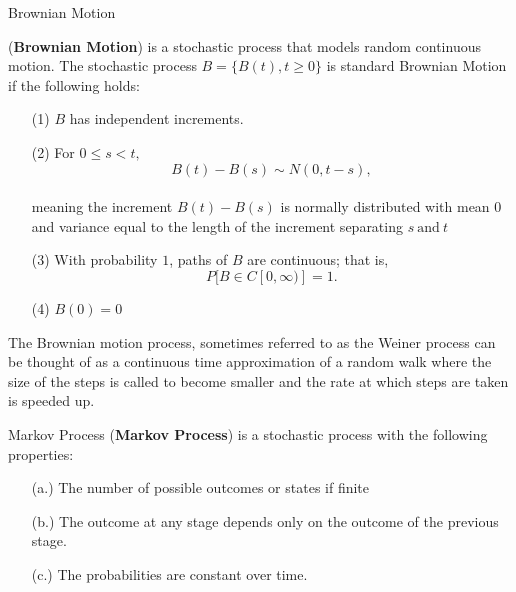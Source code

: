 \begin{frame}{Brownian Motion}
\begin{definition}(\textbf{Brownian Motion}) is a stochastic process that models random continuous motion. The stochastic process $B=\{B(t), t\geq 0\}$ is standard Brownian Motion if the following holds:
\begin{enumerate}
\item[(1)]
$B$ has independent increments.
\item[(2)]
For $0 \leq s < t,$ $$B(t)-B(s) \sim N(0,t-s),$$\\
meaning the increment $B(t)-B(s)$ is normally distributed with mean $0$ and variance equal to the length of the increment separating $s \ \text{and} \ t$
\item[(3)] With probability $1$, paths of $B$ are continuous; that is, $$P[B \in C[0, \infty)]=1.$$
\item[(4)] $B(0)=0$ 
\end{enumerate}
\end{definition}

The Brownian motion process, sometimes referred to as the Weiner process can be thought of as a continuous time approximation of a random walk where the size of the steps is called to become smaller and the rate at which steps are taken is speeded up. \\
\end{frame}


\begin{frame}

\end{frame}


\begin{frame}{Markov Process}
(\textbf{Markov Process}) is a stochastic process with the following properties: 
\begin{enumerate}
\item[(a.)] The number of possible outcomes or states if finite
\item[(b.)] The outcome at any stage depends only on the outcome of the previous stage.
\item[(c.)] The probabilities are constant over time.   
\end{enumerate}
\end{frame}

